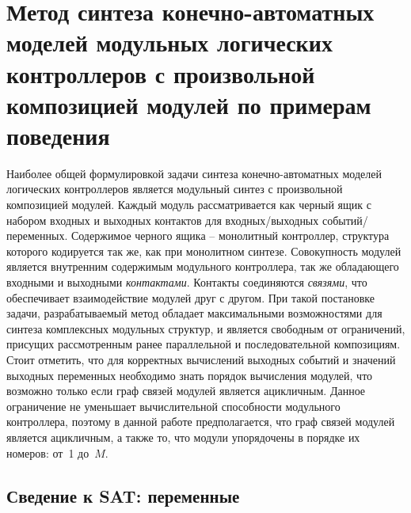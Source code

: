 % 
\section{Метод синтеза конечно-автоматных моделей модульных логических контроллеров с произвольной композицией модулей по примерам поведения}%
\label{sec:modular-arbitrary-synthesis}

Наиболее общей формулировкой задачи синтеза конечно-автоматных моделей логических контроллеров является модульный синтез с произвольной композицией модулей.
Каждый модуль рассматривается как черный ящик с набором входных и выходных контактов для входных/выходных событий/переменных. Содержимое черного ящика \--- монолитный контроллер, структура которого кодируется так же, как при монолитном синтезе.
Совокупность модулей является внутренним содержимым модульного контроллера, так же обладающего входными и выходными \emph{контактами}.
Контакты соединяются \emph{связями}, что обеспечивает взаимодействие модулей друг с другом.
При такой постановке задачи, разрабатываемый метод обладает максимальными возможностями для синтеза комплексных модульных структур, и является свободным от ограничений, присущих рассмотренным ранее параллельной и последовательной композициям.
Стоит отметить, что для корректных вычислений выходных событий и значений выходных переменных необходимо знать порядок вычисления модулей, что возможно только если граф связей модулей является ацикличным.
Данное ограничение не уменьшает вычислительной способности модульного контроллера, поэтому в данной работе предполагается, что граф связей модулей является ацикличным, а также то, что модули упорядочены в порядке их номеров: от~1 до~$M$.



\subsection{Сведение к SAT: переменные}%
\label{sub:modular-arbitrary-variables}

